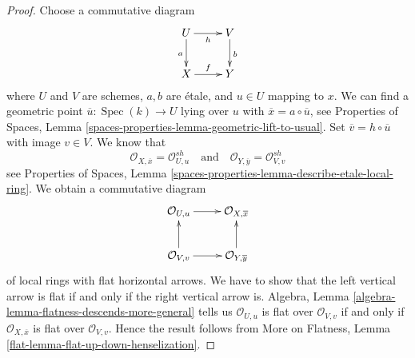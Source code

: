 \documentclass[10pt,a4paper]{amsart}
\theoremstyle{plain}
\theoremstyle{definition}
\theoremstyle{remark}
\numberwithin{equation}{subsection}
\def\Spec{\mathop{\mathrm{Spec}}}
\begin{document}
\begin{proof}
Choose a commutative diagram
$$
\xymatrix{
U \ar[d]_a \ar[r]_h & V \ar[d]^b \\
X \ar[r]^f & Y
}
$$
where $U$ and $V$ are schemes, $a, b$ are \'etale, and
$u \in U$ mapping to $x$. We can find a geometric point
$\overline{u} : \Spec(k) \to U$ lying over $u$ with
$\overline{x} = a \circ \overline{u}$, see
Properties of Spaces, Lemma
\ref{spaces-properties-lemma-geometric-lift-to-usual}.
Set $\overline{v} = h \circ \overline{u}$ with image $v \in V$.
We know that
$$
\mathcal{O}_{X, \overline{x}} = \mathcal{O}_{U, u}^{sh}
\quad\text{and}\quad
\mathcal{O}_{Y, \overline{y}} = \mathcal{O}_{V, v}^{sh}
$$
see
Properties of Spaces, Lemma
\ref{spaces-properties-lemma-describe-etale-local-ring}.
We obtain a commutative diagram
$$
\xymatrix{
\mathcal{O}_{U, u} \ar[r] &
\mathcal{O}_{X, \overline{x}} \\
\mathcal{O}_{V, v} \ar[u] \ar[r] &
\mathcal{O}_{Y, \overline{y}} \ar[u]
}
$$
of local rings with flat horizontal arrows. We have to show that the
left vertical arrow is flat if and only if the right vertical arrow is.
Algebra, Lemma \ref{algebra-lemma-flatness-descends-more-general}
tells us $\mathcal{O}_{U, u}$ is flat over $\mathcal{O}_{V, v}$
if and only if $\mathcal{O}_{X, \overline{x}}$ is flat over
$\mathcal{O}_{V, v}$. Hence the result follows from
More on Flatness, Lemma \ref{flat-lemma-flat-up-down-henselization}.
\end{proof}
\end{document}
